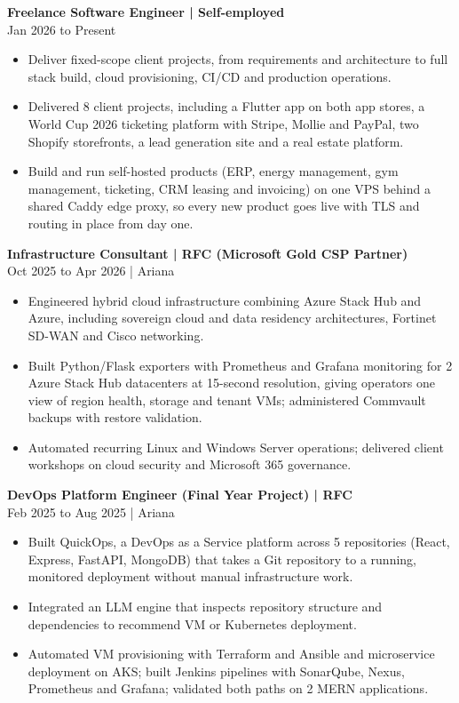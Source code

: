 \documentclass[11pt,a4paper]{article}
\newcommand{\role}[3]{\Needspace{5\baselineskip}\textbf{#1 | #2}\\#3\par}
\begin{document}
\role{Freelance Software Engineer}{Self-employed}{Jan 2026 to Present}
\begin{itemize}
\item Deliver fixed-scope client projects, from requirements and architecture to full stack build, cloud provisioning, CI/CD and production operations.
\item Delivered 8 client projects, including a Flutter app on both app stores, a World Cup 2026 ticketing platform with Stripe, Mollie and PayPal, two Shopify storefronts, a lead generation site and a real estate platform.
\item Build and run self-hosted products (ERP, energy management, gym management, ticketing, CRM leasing and invoicing) on one VPS behind a shared Caddy edge proxy{}, so every new product goes live with TLS and routing in place from day one.
\end{itemize}

\role{Infrastructure Consultant}{RFC (Microsoft Gold CSP Partner)}{Oct 2025 to Apr 2026 | Ariana}
\begin{itemize}
\item Engineered hybrid cloud infrastructure combining Azure Stack Hub and Azure, including sovereign cloud and data residency architectures, Fortinet SD-WAN and Cisco networking.
\item Built Python/Flask exporters with Prometheus and Grafana monitoring for 2 Azure Stack Hub datacenters at 15-second resolution, giving operators one view of region health, storage and tenant VMs; administered Commvault backups with restore validation.
\item Automated recurring Linux and Windows Server operations; delivered client workshops on cloud security and Microsoft 365 governance.
\end{itemize}

\role{DevOps Platform Engineer (Final Year Project)}{RFC}{Feb 2025 to Aug 2025 | Ariana}
\begin{itemize}
\item Built QuickOps, a DevOps as a Service platform across 5 repositories (React, Express, FastAPI, MongoDB) that takes a Git repository to a running, monitored deployment without manual infrastructure work.
\item Integrated an LLM engine that inspects repository structure and dependencies to recommend VM or Kubernetes deployment.
\item Automated VM provisioning with Terraform and Ansible and microservice deployment on AKS; built Jenkins pipelines with SonarQube, Nexus, Prometheus and Grafana; validated both paths on 2 MERN applications.
\end{itemize}
\end{document}
